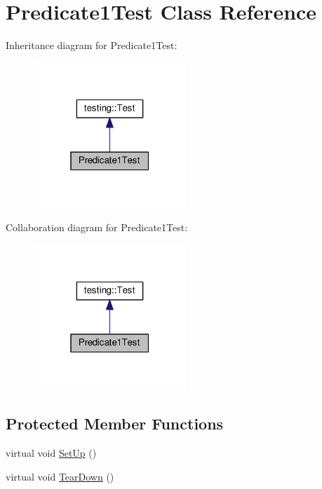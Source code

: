 \hypertarget{classPredicate1Test}{}\section{Predicate1\+Test Class Reference}
\label{classPredicate1Test}


Inheritance diagram for Predicate1\+Test\+:\nopagebreak
\begin{figure}[H]
\begin{center}
\leavevmode
\includegraphics[width=163pt]{classPredicate1Test__inherit__graph}
\end{center}
\end{figure}


Collaboration diagram for Predicate1\+Test\+:\nopagebreak
\begin{figure}[H]
\begin{center}
\leavevmode
\includegraphics[width=163pt]{classPredicate1Test__coll__graph}
\end{center}
\end{figure}
\subsection*{Protected Member Functions}
\begin{DoxyCompactItemize}
\item 
virtual void \hyperlink{classPredicate1Test_a481704a09f73a37158513f9a336dbdd9}{Set\+Up} ()
\item 
virtual void \hyperlink{classPredicate1Test_ad2974af5c6abc508847c3a9912b24a90}{Tear\+Down} ()
\end{DoxyCompactItemize}
